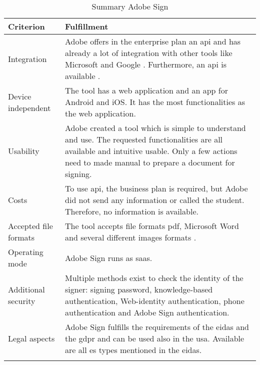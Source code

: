 	\begin{longtable}{|p{4cm}|p{10cm}|} \hline
		Criterion & Fulfillment \\ \hline
		Integration & Adobe offers in the enterprise plan an \gls{api} and has already a lot of integration with other tools like Microsoft and Google \parencite{adobesign2018integration,adobesign2018info}. Furthermore, an \gls{api} is available \parencite{adobesign2018api}. \\ \hline
		Device independent & The tool has a web application and an \gls{app} for Android and iOS. It has the most functionalities as the web application. \\ \hline
		Usability & Adobe created a tool which is simple to understand and use. The requested functionalities are all available and intuitive usable. Only a few actions need to made manual to prepare a document for signing. \\ \hline
		Costs & To use \gls{api}, the business plan is required, but Adobe did not send any information or called the student. Therefore, no information is available.\\ \hline
		Accepted file formats & The tool accepts file formats \gls{pdf}, Microsoft Word and several different images formats \parencite{adobesign2018info}. \\ \hline
		Operating mode & Adobe Sign runs as \gls{saas}. \parencite{adobesign2016} \\ \hline
		Additional security & Multiple methods exist to check the identity of the signer: signing password, knowledge-based authentication, Web-identity authentication, phone authentication and Adobe Sign authentication. \parencite{adobesign2018security} \\ \hline
		Legal aspects & Adobe Sign fulfills the requirements of the \gls{eidas} and the \gls{gdpr} and can be used also in the \gls{usa}. Available are all \gls{es} types mentioned in the \gls{eidas}. \parencite{adobesign2018legal,adobesign2018gdpr, adobesign2018es}\\ \hline
	\caption{Summary Adobe Sign}
	\label{tab:adobesign}
	\end{longtable}

